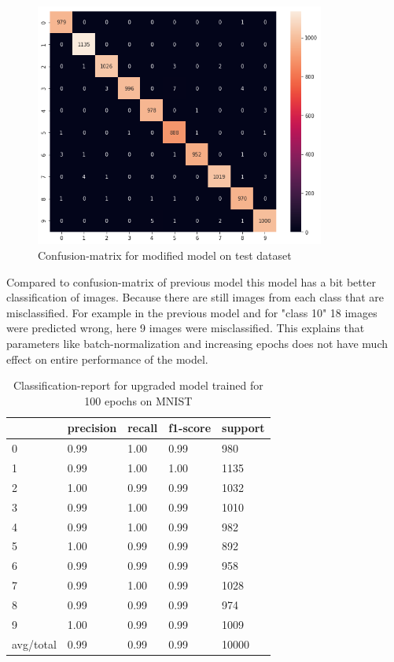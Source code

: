 \begin{figure}[h!]
    \centering
    \includegraphics[width=0.85\textwidth]{thesis_template/images/con2.png}
    \caption{\small Confusion-matrix for modified model on test dataset}
    \label{}
    \end{figure}
\newpage\noindent Compared to confusion-matrix of previous model this model has a bit better classification of images. Because there are still images from each class that are misclassified. For example in the previous model and for "class 10" 18 images were predicted wrong, here 9 images were misclassified. This explains that parameters like batch-normalization and increasing epochs does not have much effect on entire performance of the model.
\begin{table}[h!]
\centering
\begin{tabular}{|l|l|l|l|l|}
\hline
          & precision & recall & f1-score & support \\ \hline
0         & 0.99      & 1.00   & 0.99     & 980     \\ \hline
1         & 0.99      & 1.00   & 1.00     & 1135    \\ \hline
2         & 1.00      & 0.99   & 0.99     & 1032    \\ \hline
3         & 0.99      & 1.00   & 0.99     & 1010    \\ \hline
4         & 0.99      & 1.00   & 0.99     & 982     \\ \hline
5         & 1.00      & 0.99   & 0.99     & 892     \\ \hline
6         & 0.99      & 0.99   & 0.99     & 958     \\ \hline
7         & 0.99      & 1.00   & 0.99     & 1028    \\ \hline
8         & 0.99      & 0.99   & 0.99     & 974     \\ \hline
9         & 1.00      & 0.99   & 0.99     & 1009    \\ \hline
avg/total & 0.99      & 0.99   & 0.99     & 10000   \\ \hline
\end{tabular}
\caption{Classification-report for upgraded model trained for 100 epochs on MNIST}
\end{table}
    
